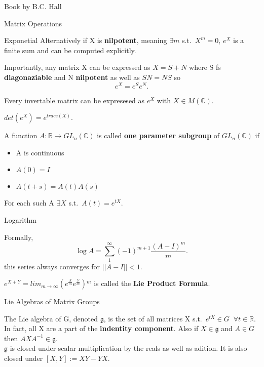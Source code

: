 \documentclass[12pt, letterpaper]{article}
\newcommand{\R}{\mathbb{R}}
\newcommand{\C}{\mathbb{C}}
\begin{document}
\begin{section}{Book by B.C. Hall}
\begin{subsection}{Matrix Operations}
\begin{subsubsection}{Exponetial}
      Alternatively if X is \textbf{nilpotent}, meaning \(\exists m\) s.t.\
      \(X^{m} = 0\), \(e^{X}\) is a finite sum and can be computed explicitly.

      Importantly, any matrix X can be expressed as \(X = S + N\) where S fs
      \textbf{diagonaziable} and N \textbf{nilpotent} as well as \(SN = NS\)
      so \[e^{X} = e^{S}e^{N}.\]

      Every invertable matrix can be expresesed as \(e^{X}\) with
      \(X \in M(\C)\).

      \(det(e^{X}) = e^{trace(X)}\).

      A function \(A: \R \to GL_{n}(\C)\) is called \textbf{one parameter
        subgroup} of \(GL_{n}(\C)\) if
      \begin{itemize}
        \item A is continuous
        \item \(A(0) = I\)
        \item \(A(t + s) = A(t)A(s)\)
      \end{itemize}
      For each such A \(\exists X\) s.t.\ \(A(t) = e^{tX}\).

    \end{subsubsection}

    \begin{subsubsection}{Logarithm}

      Formally, \[\log A = \sum^{\infty}_{1} (-1)^{m + 1} \frac{(A - I)^{m}}{m}.\]
      this series always converges for \(|| A - I || <1\).

      \(e^{X + Y} = lim_{m \to \infty} (e^{\frac{X}{m}} e^{\frac{Y}{m}}){}^{m}\)
      is called the \textbf{Lie Product Formula}.

    \end{subsubsection}

  \end{subsection}

  \begin{subsection}{Lie Algebras of Matrix Groups}

    The Lie algebra of G, denoted \(\mathfrak{g}\), is the set of all matrices X
    s.t.\ \(e^{tX} \in G \;\; \forall t \in \R\). In fact, all X are a part of
    the \textbf{indentity component}. Also if \(X \in \mathfrak{g}\) and
    \(A \in G\) then \(AXA^{-1} \in \mathfrak{g}\). \\
    \(\mathfrak{g}\) is closed under scalar multiplication by the reals as well
    as adition. It is also closed under \([X, Y] := XY- YX\).


\end{subsection}
\end{section}
\end{document}
